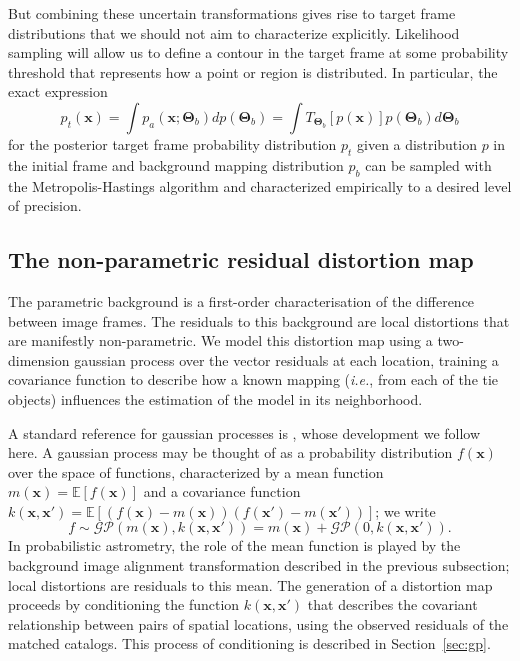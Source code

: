 \documentclass[manuscript]{aastex}
\newcommand{\bsT}{\boldsymbol\Theta}
\begin{document}
But combining these uncertain transformations gives rise to target frame distributions that we should not aim to characterize explicitly. Likelihood sampling will allow us to define a contour in the target frame at some probability threshold that represents how a point or region is distributed. In particular, the exact expression
\begin{equation}
p_t(\mathbf{x}) = \int p_a(\mathbf{x};\bsT_b) dp(\bsT_b) = \int T_{\bsT_b}\left[p(\mathbf{x})\right]p(\bsT_b) d\bsT_b\label{eq:pt_background}
\end{equation}
for the posterior target frame probability distribution $p_t$ given a distribution $p$ in the initial frame and background mapping distribution $p_b$ can be sampled with the Metropolis-Hastings algorithm and characterized empirically to a desired level of precision.

\subsection{The non-parametric residual distortion map}\label{ss:np}
The parametric background is a first-order characterisation of the difference between image frames. The residuals to this background are local distortions that are manifestly non-parametric. We model this distortion map using a two-dimension gaussian process over the vector residuals at each location, training a covariance function to describe how a known mapping (\emph{i.e.}, from each of the tie objects) influences the estimation of the model in its neighborhood. 

A standard reference for gaussian processes is \citet{rasmussen2006gaussian}, whose development we follow here. A gaussian process may be thought of as a probability distribution $f(\mathbf{x})$ over the space of functions, characterized by a mean function $m(\mathbf{x}) = \mathbb{E}\left[f(\mathbf{x})\right]$ and a covariance function $k(\mathbf{x},\mathbf{x}') = \mathbb{E}\left[\left(f(\mathbf{x})-m(\mathbf{x})\right) \left(f(\mathbf{x}')-m(\mathbf{x}')\right)\right]$; we write
\begin{equation}
f \sim \mathcal{GP}(m(\mathbf{x}), k(\mathbf{x},\mathbf{x}')) = m(\mathbf{x}) + \mathcal{GP}(0, k(\mathbf{x},\mathbf{x}')).
\end{equation}
In probabilistic astrometry, the role of the mean function is played by the background image alignment transformation described in the previous subsection; local distortions are residuals to this mean. The generation of a distortion map proceeds by conditioning the function $k(\mathbf{x},\mathbf{x}')$ that describes the covariant relationship between pairs of spatial locations, using the observed residuals of the matched catalogs. This process of conditioning is described in Section~\ref{sec:gp}.
\end{document}

